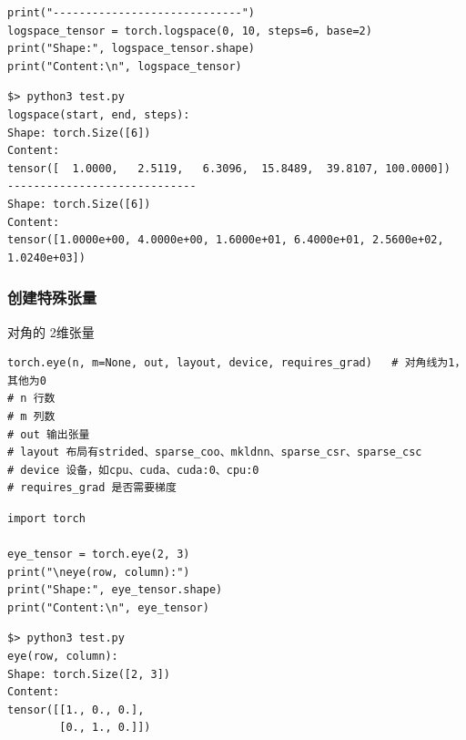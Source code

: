 \begin{enumerate}[label=\arabic*)]
\begin{lstlisting}[style=pythonstyle,mathescape=true]
print("-----------------------------")
logspace_tensor = torch.logspace(0, 10, steps=6, base=2)
print("Shape:", logspace_tensor.shape)
print("Content:\n", logspace_tensor)
\end{lstlisting}
\begin{lstlisting}[style=demostyle,numbers=none]
$> python3 test.py
logspace(start, end, steps):
Shape: torch.Size([6])
Content:
tensor([  1.0000,   2.5119,   6.3096,  15.8489,  39.8107, 100.0000])
-----------------------------
Shape: torch.Size([6])
Content:
tensor([1.0000e+00, 4.0000e+00, 1.6000e+01, 6.4000e+01, 2.5600e+02, 1.0240e+03])
\end{lstlisting}
\end{enumerate}

\subsubsection{创建特殊张量}
对角的 \textcolor{YBXPurple}{2维}张量
\begin{lstlisting}[style=demostyle,numbers=none]
torch.eye(n, m=None, out, layout, device, requires_grad)   # 对角线为1，其他为0
# n 行数
# m 列数
# out 输出张量
# layout 布局有strided、sparse_coo、mkldnn、sparse_csr、sparse_csc
# device 设备，如cpu、cuda、cuda:0、cpu:0
# requires_grad 是否需要梯度
\end{lstlisting}
\begin{lstlisting}[style=pythonstyle]
import torch

eye_tensor = torch.eye(2, 3)
print("\neye(row, column):")
print("Shape:", eye_tensor.shape)
print("Content:\n", eye_tensor) 
\end{lstlisting}
\begin{lstlisting}[style=demostyle,numbers=none]
$> python3 test.py
eye(row, column):
Shape: torch.Size([2, 3])
Content:
tensor([[1., 0., 0.],
        [0., 1., 0.]])
\end{lstlisting}



